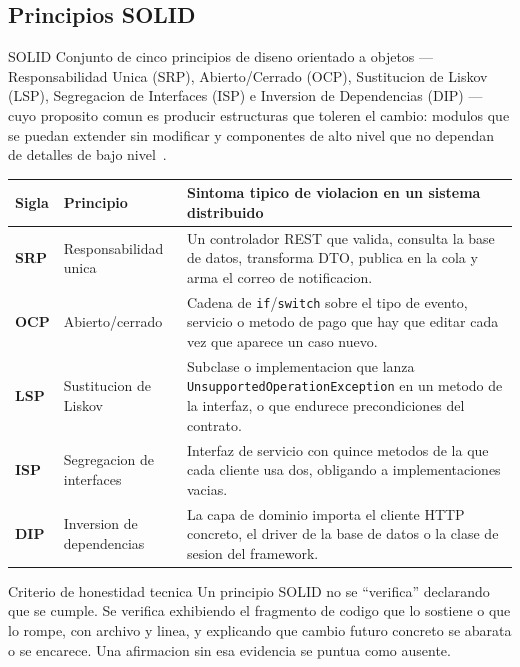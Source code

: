 \documentclass[11pt,a4paper]{article}
\begin{document}
\subsection{Principios SOLID}

\begin{defBox}{SOLID}
    Conjunto de cinco principios de diseno orientado a objetos --- Responsabilidad Unica (SRP), Abierto/Cerrado (OCP), Sustitucion de Liskov (LSP), Segregacion de Interfaces (ISP) e Inversion de Dependencias (DIP) --- cuyo proposito comun es producir estructuras que toleren el cambio: modulos que se puedan extender sin modificar y componentes de alto nivel que no dependan de detalles de bajo nivel~\cite{Martin2017CleanArchitecture}.
\end{defBox}

\noindent
\begin{tabularx}{\linewidth}{@{}>{\bfseries}p{1.2cm} >{\RaggedRight}p{3.4cm} X@{}}
    \toprule
    \rowcolor{uteqSoft}\textbf{\color{uteqBlue}Sigla} & \textbf{\color{uteqBlue}Principio} & \textbf{\color{uteqBlue}Sintoma tipico de violacion en un sistema distribuido} \\
    \midrule
    SRP & Responsabilidad unica & Un controlador REST que valida, consulta la base de datos, transforma DTO, publica en la cola y arma el correo de notificacion. \\
    OCP & Abierto/cerrado & Cadena de \texttt{if}/\texttt{switch} sobre el tipo de evento, servicio o metodo de pago que hay que editar cada vez que aparece un caso nuevo. \\
    LSP & Sustitucion de Liskov & Subclase o implementacion que lanza \texttt{UnsupportedOperationException} en un metodo de la interfaz, o que endurece precondiciones del contrato. \\
    ISP & Segregacion de interfaces & Interfaz de servicio con quince metodos de la que cada cliente usa dos, obligando a implementaciones vacias. \\
    DIP & Inversion de dependencias & La capa de dominio importa el cliente HTTP concreto, el driver de la base de datos o la clase de sesion del framework. \\
    \bottomrule
\end{tabularx}

\vspace{6pt}

\begin{avisoBox}{Criterio de honestidad tecnica}
    Un principio SOLID no se ``verifica'' declarando que se cumple. Se verifica exhibiendo el fragmento de codigo que lo sostiene o que lo rompe, con archivo y linea, y explicando que cambio futuro concreto se abarata o se encarece. Una afirmacion sin esa evidencia se puntua como ausente.
\end{avisoBox}
\end{document}

